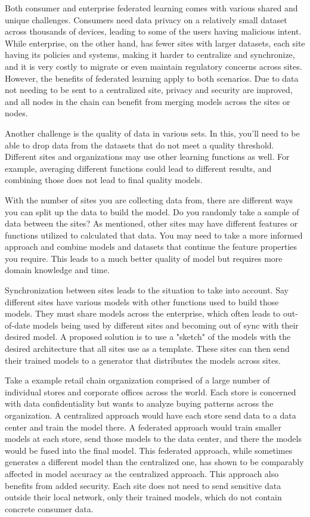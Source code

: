 \documentclass[journal,onecolumn]{IEEEtran}
\begin{document}
Both consumer and enterprise federated learning comes with various shared and unique challenges. Consumers need data privacy on a relatively small dataset across thousands of devices, leading to some of the users having malicious intent. While enterprise, on the other hand, has fewer sites with larger datasets, each site having its policies and systems, making it harder to centralize and synchronize, and it is very costly to migrate or even maintain regulatory concerns across sites. However, the benefits of federated learning apply to both scenarios. Due to data not needing to be sent to a centralized site, privacy and security are improved, and all nodes in the chain can benefit from merging models across the sites or nodes. 

Another challenge is the quality of data in various sets. In this, you'll need to be able to drop data from the datasets that do not meet a quality threshold. Different sites and organizations may use other learning functions as well. For example, averaging different functions could lead to different results, and combining those does not lead to final quality models. 

With the number of sites you are collecting data from, there are different ways you can split up the data to build the model. Do you randomly take a sample of data between the sites? As mentioned, other sites may have different features or functions utilized to calculated that data. You may need to take a more informed approach and combine models and datasets that continue the feature properties you require. This leads to a much better quality of model but requires more domain knowledge and time. 

Synchronization between sites leads to the situation to take into account. Say different sites have various models with other functions used to build those models. They must share models across the enterprise, which often leads to out-of-date models being used by different sites and becoming out of sync with their desired model. A proposed solution is to use a "sketch" of the models with the desired architecture that all sites use as a template. These sites can then send their trained models to a generator that distributes the models across sites. 

Take a example retail chain organization comprised of a large number of individual stores and corporate offices across the world. Each store is concerned with data confidentiality but wants to analyze buying patterns across the organization. A centralized approach would have each store send data to a data center and train the model there. A federated approach would train smaller models at each store, send those models to the data center, and there the models would be fused into the final model. This federated approach, while sometimes generates a different model than the centralized one, has shown to be comparably affected in model accuracy as the centralized approach. This approach also benefits from added security. Each site does not need to send sensitive data outside their local network, only their trained models, which do not contain concrete consumer data. 
\end{document}
